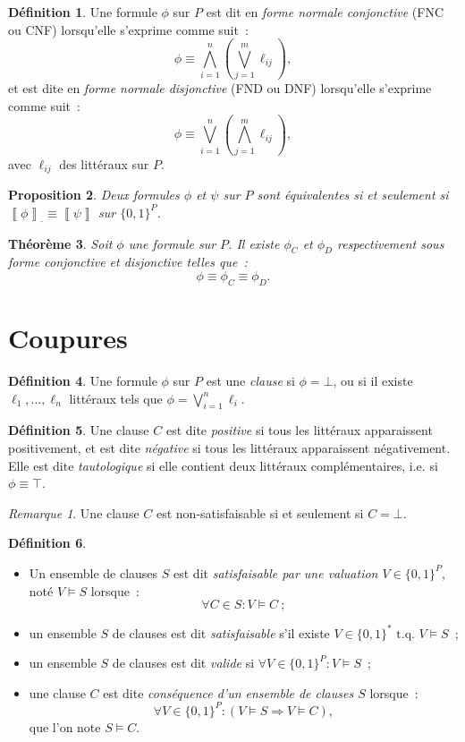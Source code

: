 \documentclass{article}
\newtheorem{thm}{Théorème}[section]
\newtheorem{prp}[thm]{Proposition}
\theoremstyle{definition}
\newtheorem{déf}[thm]{Définition}
\theoremstyle{remark}
\newtheorem*{rmq}{Remarque}
\newcommand{\logeval}[1]{\left\llbracket#1\right\rrbracket}
\newcommand{\tq}{\text{ t.q. }}
\begin{document}
	\begin{déf} Une formule $\phi$ sur $P$ est dit en \textit{forme normale conjonctive} (FNC ou CNF) lorsqu'elle s'exprime comme suit~:
	\[\phi \equiv \bigwedge_{i=1}^n\left(\bigvee_{j=1}^m\ell_{ij}\right),\]
	et est dite en \textit{forme normale disjonctive} (FND ou DNF) lorsqu'elle s'exprime comme suit~:
	\[\phi \equiv \bigvee_{i=1}^n\left(\bigwedge_{j=1}^m\ell_{ij}\right),\]
	avec $\ell_{ij}$ des littéraux sur $P$.
	\end{déf}

	\begin{prp} Deux formules $\phi$ et $\psi$ sur $P$ sont équivalentes si et seulement si $\logeval \phi_\cdot \equiv \logeval \psi$ sur $\{0, 1\}^P$.
	\end{prp}

	\begin{thm} Soit $\phi$ une formule sur $P$. Il existe $\phi_C$ et $\phi_D$  respectivement sous forme conjonctive et disjonctive telles que~:
	\[\phi \equiv \phi_C \equiv \phi_D.\]
	\end{thm}

\section{Coupures}
	\begin{déf} Une formule $\phi$ sur $P$ est une \textit{clause} si $\phi = \bot$, ou si il existe $\ell_1, \ldots, \ell_n$ littéraux
	tels que $\phi = \bigvee_{i=1}^n\ell_i$.
	\end{déf}

	\begin{déf} Une clause $C$ est dite \textit{positive} si tous les littéraux apparaissent positivement, et est dite \textit{négative} si tous les
	littéraux apparaissent négativement. Elle est dite \textit{tautologique} si elle contient deux littéraux complémentaires, i.e. si $\phi \equiv \top$.
	\end{déf}

	\begin{rmq} Une clause $C$ est non-satisfaisable si et seulement si $C = \bot$.
	\end{rmq}

	\begin{déf}~
	\begin{itemize}
		\item Un ensemble de clauses $S$ est dit \textit{satisfaisable par une valuation $V \in \{0, 1\}^P$}, noté $V \models S$ lorsque~:
		\[\forall C \in S : V \models C~;\]
		\item un ensemble $S$ de clauses est dit \textit{satisfaisable} s'il existe $V \in \{0, 1\}^* \tq V \models S$~;
		\item un ensemble $S$ de clauses est dit \textit{valide} si $\forall V \in \{0, 1\}^P : V \models S$~;
		\item une clause $C$ est dite \textit{conséquence d'un ensemble de clauses $S$} lorsque~:
		\[\forall V \in \{0, 1\}^P : \left(V \models S \Rightarrow V \models C\right),\]
		que l'on note $S \models C$.
	\end{itemize}
	\end{déf}
\end{document}
